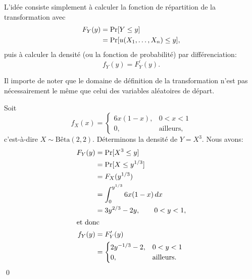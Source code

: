 L'idée consiste simplement à calculer la fonction de répartition de la
transformation avec
\begin{align*}
  F_Y(y)
  &= \operatorname{Pr} [ Y \leq y ] \\
  &= \operatorname{Pr} [ u(X_1, \dots, X_n) \leq y ],
\end{align*}
puis à calculer la densité (ou la fonction de probabilité) par
différenciation:
\begin{displaymath}
  f_Y(y) = F_Y^\prime(y).
\end{displaymath}

\begin{rem}
  Il importe de noter que le domaine de définition de la
  transformation n'est pas nécessairement le même que celui des
  variables aléatoires de départ.
\end{rem}

\begin{exemple}
  Soit
  \begin{displaymath}
    f_X(x) =
    \begin{cases}
      6x (1 - x), & 0 < x < 1 \\
      0, & \text{ailleurs},
    \end{cases}
  \end{displaymath}
  c'est-à-dire $X \sim \text{Bêta}(2, 2)$. Déterminons la densité de
  $Y = X^3$. Nous avons:
  \begin{align*}
    F_Y(y)
    &= \operatorname{Pr} [ X^3 \leq y ] \\
    &= \operatorname{Pr} [ X \leq y^{1/3} ] \\
    &= F_X(y^{1/3}) \\
    &= \int_0^{y^{1/3}} 6x(1 - x)\, dx \\
    &= 3y^{2/3} - 2y, \qquad 0 < y < 1, \\
    \intertext{et donc}
    f_Y(y)
    &= F_Y^\prime(y) \\
    &=
    \begin{cases}
      2y^{-1/3} - 2, & 0 < y < 1 \\
      0, & \text{ailleurs}.
    \end{cases}
  \end{align*}
  \qed
\end{exemple}


